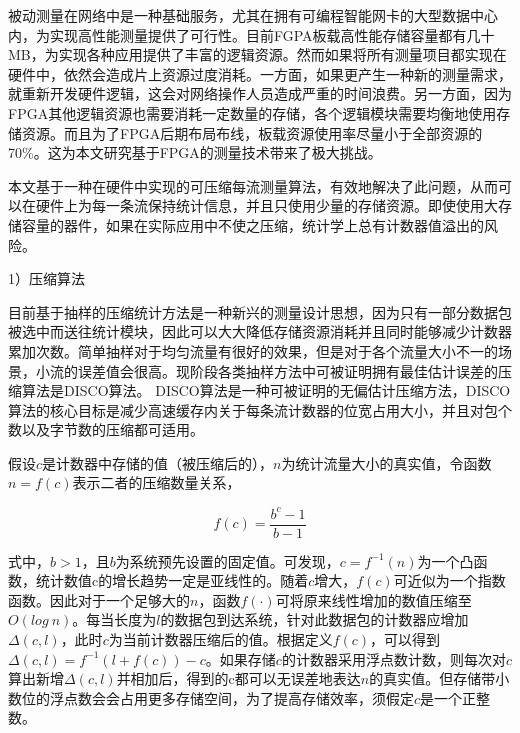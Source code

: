 
被动测量在网络中是一种基础服务，尤其在拥有可编程智能网卡的大型数据中心内，为实现高性能测量提供了可行性。目前FGPA板载高性能存储容量都有几十MB，为实现各种应用提供了丰富的逻辑资源。然而如果将所有测量项目都实现在硬件中，依然会造成片上资源过度消耗。一方面，如果更产生一种新的测量需求，就重新开发硬件逻辑，这会对网络操作人员造成严重的时间浪费。另一方面，因为FPGA其他逻辑资源也需要消耗一定数量的存储，各个逻辑模块需要均衡地使用存储资源。而且为了FPGA后期布局布线，板载资源使用率尽量小于全部资源的70\%。这为本文研究基于FPGA的测量技术带来了极大挑战。

本文基于一种在硬件中实现的可压缩每流测量算法，有效地解决了此问题，从而可以在硬件上为每一条流保持统计信息，并且只使用少量的存储资源。即使使用大存储容量的器件，如果在实际应用中不使之压缩，统计学上总有计数器值溢出的风险。


1）压缩算法

目前基于抽样的压缩统计方法是一种新兴的测量设计思想，因为只有一部分数据包被选中而送往统计模块，因此可以大大降低存储资源消耗并且同时能够减少计数器累加次数。简单抽样对于均匀流量有很好的效果，但是对于各个流量大小不一的场景，小流的误差值会很高。现阶段各类抽样方法中可被证明拥有最佳估计误差的压缩算法是DISCO算法。%
DISCO算法是一种可被证明的无偏估计压缩方法，DISCO算法的核心目标是减少高速缓存内关于每条流计数器的位宽占用大小，并且对包个数以及字节数的压缩都可适用。

假设$ c $是计数器中存储的值（被压缩后的），$ n $为统计流量大小的真实值，令函数$ n=f(c) $表示二者的压缩数量关系，

\begin{equation} \label{discofunc}
f(c)=\frac{b^c-1}{b-1}
\end{equation}

式中，$ b>1 $，且$ b $为系统预先设置的固定值。可发现，$ c=f^{-1}(n) $为一个凸函数，统计数值c的增长趋势一定是亚线性的。随着$ c $增大，$ f(c) $可近似为一个指数函数。因此对于一个足够大的$ n $，函数$ f(\cdot) $可将原来线性增加的数值压缩至$ O(log~n) $。每当长度为$ l $的数据包到达系统，针对此数据包的计数器应增加$ \Delta(c,l) $，此时$ c $为当前计数器压缩后的值。根据定义$ f(c) $，可以得到$ \Delta(c,l)=f^{-1}(l+f(c))-c $。如果存储$ c $的计数器采用浮点数计数，则每次对$ c $算出新增$ \Delta(c,l) $并相加后，得到的c都可以无误差地表达$ n $的真实值。但存储带小数位的浮点数会会占用更多存储空间，为了提高存储效率，须假定$ c $是一个正整数。



